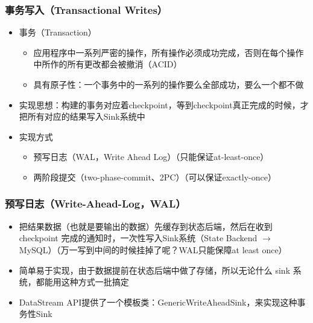 \documentclass{beamer}
\begin{document}
  \begin{frame}
      \frametitle{事务写入（Transactional Writes）}
  
      \begin{itemize}
          \item 事务（Transaction）
          \begin{itemize}
              \item 应用程序中一系列严密的操作，所有操作必须成功完成，否则在每个操作中所作的所有更改都会被撤消（ACID）
              \item 具有原子性：一个事务中的一系列的操作要么全部成功，要么一个都不做
          \end{itemize}
          \item 实现思想：构建的事务对应着checkpoint，等到checkpoint真正完成的时候，才把所有对应的结果写入Sink系统中
          \item 实现方式
          \begin{itemize}
              \item 预写日志（WAL，Write Ahead Log）（只能保证at-least-once）
              \item 两阶段提交（two-phase-commit、2PC）（可以保证exactly-once）
          \end{itemize}
      \end{itemize}
  
  \end{frame}

  \begin{frame}
      \frametitle{预写日志（Write-Ahead-Log，WAL）}
  
      \begin{itemize}
          \item 把结果数据（也就是要输出的数据）先缓存到状态后端，然后在收到 checkpoint 完成的通知时，一次性写入Sink系统（State Backend $\rightarrow$ MySQL）（万一写到中间的时候挂掉了呢？WAL只能保障at least once）
          \item 简单易于实现，由于数据提前在状态后端中做了存储，所以无论什么 sink 系统，都能用这种方式一批搞定
          \item DataStream API提供了一个模板类：GenericWriteAheadSink，来实现这种事务性Sink
      \end{itemize}
  
  \end{frame}
\end{document}
